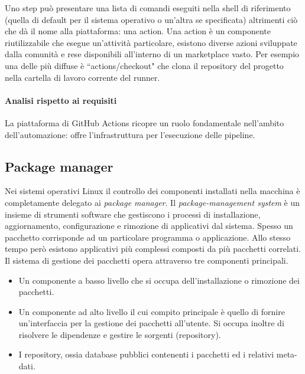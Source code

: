 Uno step può presentare una lista di comandi eseguiti nella shell di riferimento (quella di default per il sistema operativo o un'altra se specificata) altrimenti ciò che dà il nome alla piattaforma: una action. Una action è un componente riutilizzabile che esegue un'attività particolare, esistono diverse azioni sviluppate dalla comunità e rese disponibili all'interno di un marketplace vasto. Per esempio una delle più diffuse è ``actions/checkout" che clona il repository del progetto nella cartella di lavoro corrente del runner.

\paragraph{Analisi rispetto ai requisiti}

La piattaforma di GitHub Actions ricopre un ruolo fondamentale nell'ambito dell'automazione: offre l'infrastruttura per l'esecuzione delle pipeline.

\subsection{Package manager}

Nei sistemi operativi Linux il controllo dei componenti installati nella macchina è completamente delegato ai \textit{package manager}. Il \textit{package-management system} è un insieme di strumenti software che gestiscono i processi di installazione, aggiornamento, configurazione e rimozione di applicativi dal sistema. Spesso un pacchetto corrisponde ad un particolare programma o applicazione. Allo stesso tempo però esistono applicativi più complessi composti da più pacchetti correlati. Il sistema di gestione dei pacchetti opera attraverso tre componenti principali.

\begin{itemize}
	\item Un componente a basso livello che si occupa dell'installazione o rimozione dei pacchetti.
	\item Un componente ad alto livello il cui compito principale è quello di fornire un'interfaccia per la gestione dei pacchetti all'utente. Si occupa inoltre di risolvere le dipendenze e gestire le sorgenti (repository).
	\item I repository, ossia database pubblici contenenti i pacchetti ed i relativi meta-dati.
\end{itemize}

